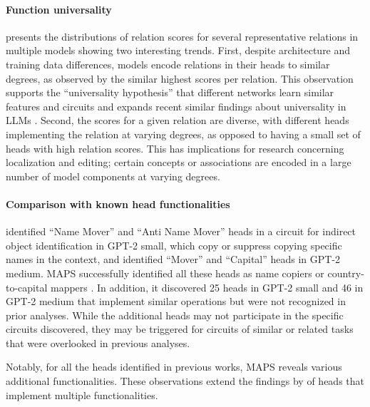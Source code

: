 \documentclass[11pt]{article}
\newcommand{\GPTsmall}{GPT-2 small}
\newcommand{\GPTmedium}{GPT-2 medium}
\newcommand{\framework}{\textsc{MAPS}}
\begin{document}
\paragraph{Function universality}
 presents the distributions of relation scores for several representative relations in multiple models showing two interesting trends. First, despite architecture and training data differences, models encode relations in their heads to similar degrees, as observed by the similar highest scores per relation. 
This observation supports the ``universality hypothesis'' \cite{pmlr-v44-li15convergent} that different networks learn similar features and circuits and expands recent similar findings about universality in LLMs \cite{gould2024successor, arditi2024refusal, tigges2024llm}.
Second, the scores for a given relation are diverse, with different heads implementing the relation at varying degrees, as opposed to having a small set of heads with high relation scores. This has implications for research concerning localization and editing; certain concepts or associations are encoded in a large number of model components at varying degrees.



\paragraph{Comparison with known head functionalities} 
\citet{wang2022interpretability} identified ``Name Mover'' and ``Anti Name Mover'' heads in a circuit for indirect object identification in {\GPTsmall}, which copy or suppress copying specific names in the context, and \citet{merullo2024circuit} identified ``Mover'' and ``Capital'' heads in {\GPTmedium}.
\framework{} successfully identified all these heads as name copiers or country-to-capital mappers \citep[which agrees with a similar analysis conducted by][]{wang2022interpretability}.
In addition, it discovered 25 heads in {\GPTsmall} and 46 in {\GPTmedium} that implement similar operations but were not recognized in prior analyses.
While the additional heads may not participate in the specific circuits discovered, they may be triggered for circuits of similar or related tasks that were overlooked in previous analyses.

Notably, for all the heads identified in previous works, \framework{} reveals various additional functionalities.
These observations extend the findings by \citet{merullo2024circuit} of heads that implement multiple functionalities.
\end{document}
